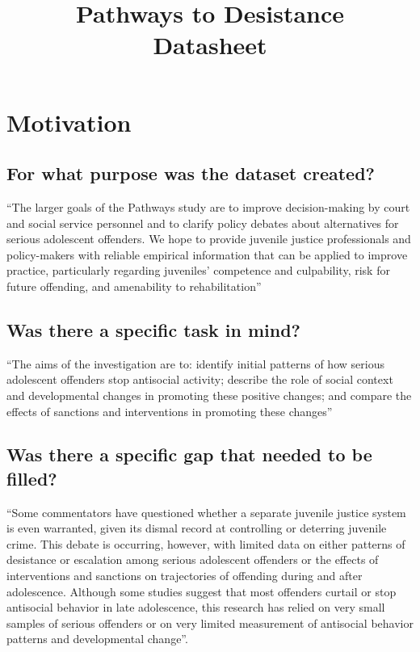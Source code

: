 \documentclass[letterpaper, 10 pt, conference]{ieeeconf}  %
\title{\LARGE \bf
Pathways to Desistance \\{\color{blue}Datasheet}
}
\begin{document}
\maketitle
\thispagestyle{empty}
\pagestyle{empty}

\section{Motivation}

\subsection{For what purpose was the dataset created?}

``The larger goals of the Pathways study are to improve decision-making by court and social service personnel and to clarify policy debates about alternatives for serious adolescent offenders. We hope to provide juvenile justice professionals and policy-makers with reliable empirical information that can be applied to improve practice, particularly regarding juveniles' competence and culpability, risk for future offending, and amenability to rehabilitation''

\subsection{Was there a specific task in mind?}

``The aims of the investigation are to: identify initial patterns of how serious adolescent offenders stop antisocial activity; describe the role of social context and developmental changes in promoting these positive changes; and
compare the effects of sanctions and interventions in promoting these changes''

\subsection{Was there a specific gap that needed to be filled?}

``Some commentators have questioned whether a separate juvenile justice system is even warranted, given its dismal record at controlling or deterring juvenile crime. This debate is occurring, however, with limited data on either patterns of desistance or escalation among serious adolescent offenders or the effects of interventions and sanctions on trajectories of offending during and after adolescence. Although some studies suggest that most offenders curtail or stop antisocial behavior in late adolescence, this research has relied on very small samples of serious offenders or on very limited measurement of antisocial behavior patterns and developmental change''.
\end{document}
